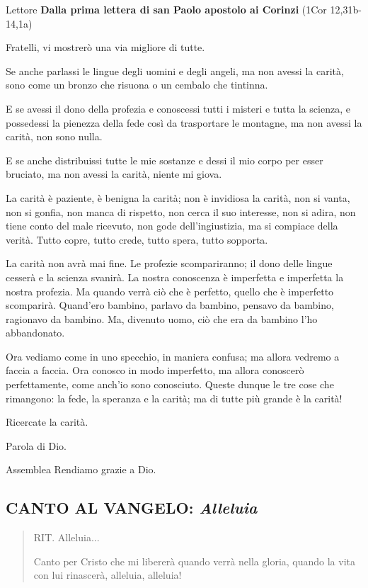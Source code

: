 \begin{dialoghi}
\item[Lettore] \textbf{Dalla prima lettera di san Paolo apostolo ai Corinzi} (1Cor 12,31b-14,1a)

Fratelli, vi mostrerò una via migliore di tutte.

Se anche parlassi le lingue degli uomini e degli angeli, ma non avessi la carità, sono come un bronzo che risuona o un cembalo che tintinna.

E se avessi il dono della profezia e conoscessi tutti i misteri e tutta la scienza, e possedessi la pienezza della fede così da trasportare le montagne, ma non avessi la carità, non sono nulla.

E se anche distribuissi tutte le mie sostanze e dessi il mio corpo per esser bruciato, ma non avessi la carità, niente mi giova.

La carità è paziente, è benigna la carità; non è invidiosa la carità, non si vanta, non si gonfia, non manca di rispetto, non cerca il suo interesse, non si adira, non tiene conto del male ricevuto, non gode dell'ingiustizia, ma si compiace della verità. Tutto copre, tutto crede, tutto spera, tutto sopporta.

La carità non avrà mai fine. Le profezie scompariranno; il dono delle lingue cesserà e la scienza svanirà. La nostra conoscenza è imperfetta e imperfetta la nostra profezia. Ma quando verrà ciò che è perfetto, quello che è imperfetto scomparirà. Quand'ero bambino, parlavo da bambino, pensavo da bambino, ragionavo da bambino. Ma, divenuto uomo, ciò che era da bambino l'ho abbandonato.

Ora vediamo come in uno specchio, in maniera confusa; ma allora vedremo a faccia a faccia. Ora conosco in modo imperfetto, ma allora conoscerò perfettamente, come anch'io sono conosciuto. Queste dunque le tre cose che rimangono: la fede, la speranza e la carità; ma di tutte più grande è la carità!

Ricercate la carità.

Parola di Dio.
\item[Assemblea] Rendiamo grazie a Dio.
\end{dialoghi}

\subsection*{CANTO AL VANGELO: \textit{Alleluia}}

\begin{verse}
\begin{mystrofe}
RIT. Alleluia...
\end{mystrofe}

\begin{mystrofe}
Canto per Cristo che mi libererà quando verrà nella gloria, quando la vita con lui rinascerà, alleluia, alleluia!
\end{mystrofe}

\end{verse}

